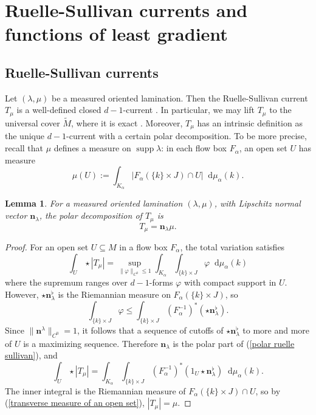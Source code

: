 \documentclass[reqno,11pt]{amsart}
\newcommand*\dif{\mathop{}\!\mathrm{d}}
\DeclareMathOperator{\supp}{supp}
\newcommand{\normal}{\mathbf n}
\newtheorem{lemma}[theorem]{Lemma}
\theoremstyle{definition}
\numberwithin{equation}{section}
\begin{document}

\section{Ruelle-Sullivan currents and functions of least gradient}\label{Prelims}
\subsection{Ruelle-Sullivan currents}\label{RS prelims}
Let $(\lambda, \mu)$ be a measured oriented lamination.
Then the Ruelle-Sullivan current $T_\mu$ is a well-defined closed $d-1$-current \cite[Theorem 8.2]{daskalopoulos2020transverse}. 
In particular, we may lift $T_\mu$ to the universal cover $\tilde M$, where it is exact \cite[Theorem 8.3]{daskalopoulos2020transverse}.
Moreover, $T_\mu$ has an intrinsic definition as the unique $d-1$-current with a certain polar decomposition.
To be more precise, recall that $\mu$ defines a measure on $\supp \lambda$: in each flow box $F_\alpha$, an open set $U$ has measure
\begin{equation}\label{transverse measure of an open set}
\mu(U) := \int_{K_\alpha} |F_\alpha(\{k\} \times J) \cap U| \dif \mu_\alpha(k).
\end{equation}

\begin{lemma}
For a measured oriented lamination $(\lambda, \mu)$, with Lipschitz normal vector $\normal_\lambda$, the polar decomposition of $T_\mu$ is
\begin{equation}\label{polar ruelle sullivan}
T_\mu = \normal_\lambda \mu.
\end{equation}
\end{lemma}
\begin{proof}
For an open set $U \subseteq M$ in a flow box $F_\alpha$, the total variation satisfies
$$\int_U \star |T_\mu| = \sup_{\|\varphi\|_{C^0} \leq 1} \int_{K_\alpha} \int_{\{k\} \times J} \varphi \dif \mu_\alpha(k)$$
where the supremum ranges over $d-1$-forms $\varphi$ with compact support in $U$.
However, $\star \normal_\lambda^\flat$ is the Riemannian measure on $F_\alpha(\{k\} \times J)$, so
$$\int_{\{k\} \times J} \varphi \leq \int_{\{k\} \times J} (F_\alpha^{-1})^*(\star \normal_\lambda^\flat).$$
Since $\|\normal^\lambda\|_{C^0} = 1$, it follows that a sequence of cutoffs of $\star \normal_\lambda^\flat$ to more and more of $U$ is a maximizing sequence.
Therefore $\normal_\lambda$ is the polar part of (\ref{polar ruelle sullivan}), and
$$\int_U \star |T_\mu| = \int_{K_\alpha} \int_{\{k\} \times J} (F_\alpha^{-1})^*(1_U \star \normal_\lambda^\flat) \dif \mu_\alpha(k).$$
The inner integral is the Riemannian measure of $F_\alpha(\{k\} \times J) \cap U$, so by (\ref{transverse measure of an open set}), $|T_\mu| = \mu$.
\end{proof}
\end{document}
